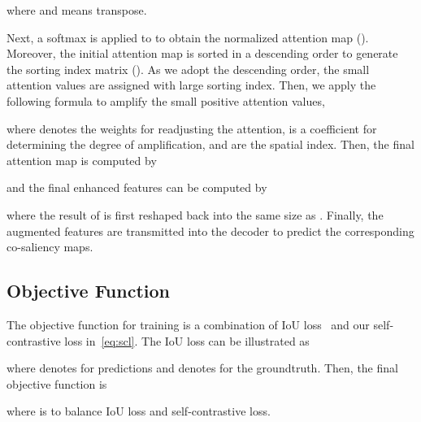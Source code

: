 \documentclass[10pt,twocolumn,letterpaper]{article}
\begin{document}
where  and  means transpose. 

Next, a softmax is applied to  to obtain the normalized attention map (). Moreover, the initial attention map  is sorted in a descending order to generate the sorting index matrix (). As we adopt the descending order, the small attention values are assigned with large sorting index. Then, we apply the following formula to amplify the small positive attention values,

where  denotes the weights for readjusting the attention,  is a coefficient for determining the degree of amplification,  and  are the spatial index. Then, the final attention map is computed by

and the final enhanced features can be computed by

where the result of  is first reshaped back into the same size as . Finally, the augmented features  are transmitted into the decoder to predict the corresponding co-saliency maps. 

\subsection{Objective Function}
The objective function for training is a combination of IoU loss~\cite{qin2019basnet, zhang2020coadnet} and our self-contrastive loss in~\cref{eq:scl}. The IoU loss can be illustrated as

where  denotes for predictions and  denotes for the groundtruth. Then, the final objective function is

where  is to balance IoU loss and self-contrastive loss.
\end{document}
